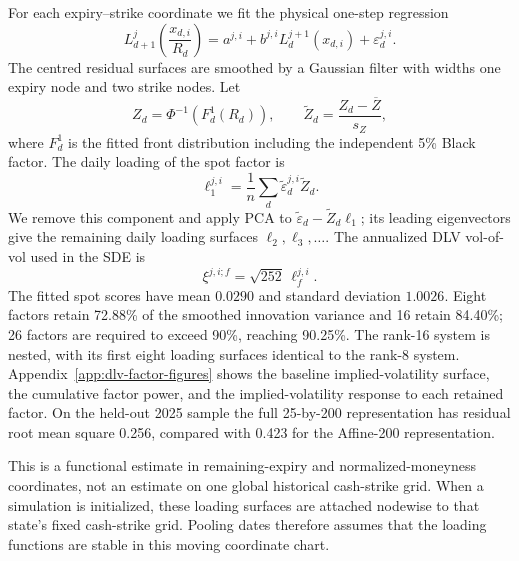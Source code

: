 \documentclass[smallextended,envcountsame,envcountsect]{svjour3}
\begin{document}
For each expiry--strike coordinate we fit the physical one-step regression
\begin{equation}
  \label{eq:estimation-dlv-ar}
  L_{d+1}^{j}\!\left(\frac{x_{d,i}}{R_d}\right)
  =a^{j,i}+b^{j,i}L_d^{j+1}(x_{d,i})+\varepsilon_d^{j,i}.
\end{equation}
The centred residual surfaces are smoothed by a Gaussian filter with widths
one expiry node and two strike nodes.  Let
\[
  Z_d=\Phi^{-1}\!\left(F_d^1(R_d)\right),
  \qquad
  \widetilde Z_d=\frac{Z_d-\overline Z}{s_Z},
\]
where $F_d^1$ is the fitted front distribution including the independent 5\%
Black factor.  The daily loading of the spot factor is
\[
  \ell_1^{j,i}=\frac1n\sum_d
    \widetilde\varepsilon_d^{j,i}\widetilde Z_d.
\]
We remove this component and apply PCA to
$\widetilde\varepsilon_d-\widetilde Z_d\ell_1$; its leading eigenvectors give
the remaining daily loading surfaces $\ell_2,\ell_3,\ldots$.  The annualized
DLV vol-of-vol used in the SDE is
\begin{equation}
  \label{eq:estimation-annualized-xi}
  \xi^{j,i;f}=\sqrt{252}\,\ell_f^{j,i}.
\end{equation}
The fitted spot scores have mean $0.0290$ and standard deviation $1.0026$.
Eight factors retain 72.88\% of the smoothed innovation variance and 16 retain
84.40\%; 26 factors are required to exceed 90\%, reaching 90.25\%.  The
rank-16 system is nested, with its first eight loading surfaces identical to
the rank-8 system.  Appendix~\ref{app:dlv-factor-figures} shows the baseline
implied-volatility surface, the cumulative factor power, and the implied-volatility
response to each retained factor.  On the held-out 2025 sample the
full 25-by-200 representation has residual root mean square 0.256, compared
with 0.423 for the Affine-200 representation.

This is a functional estimate in remaining-expiry and normalized-moneyness
coordinates, not an estimate on one global historical cash-strike grid.  When
a simulation is initialized, these loading surfaces are attached nodewise to
that state's fixed cash-strike grid.  Pooling dates therefore assumes that the
loading functions are stable in this moving coordinate chart.
\end{document}
